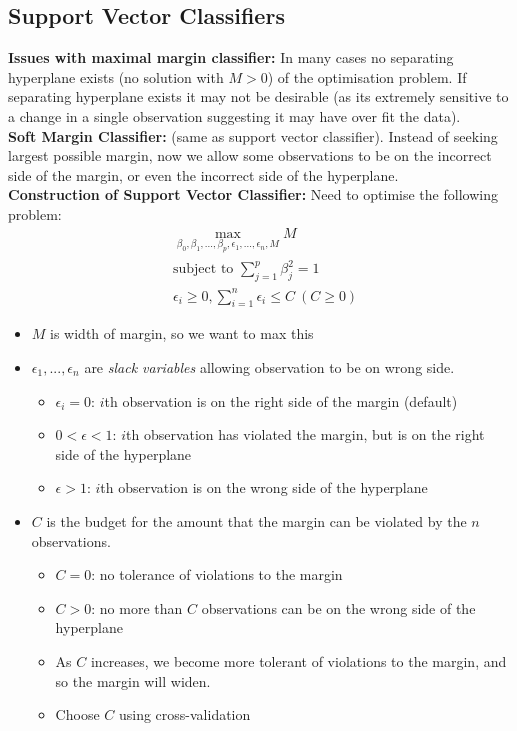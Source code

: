 \documentclass[11pt]{article}
\begin{document}
\subsection{Support Vector Classifiers}

\noindent \textbf{Issues with maximal margin classifier:} In many cases no separating hyperplane exists (no solution with $M>0$) of the optimisation problem. If separating hyperplane exists it may not be desirable (as its extremely sensitive to a change in a single observation suggesting it may have over fit the data). \\

\noindent \textbf{Soft Margin Classifier:} (same as support vector classifier). Instead of seeking largest possible margin, now we allow some observations to be on the incorrect side of the margin, or even the incorrect side of the hyperplane. \\

\noindent \textbf{Construction of Support Vector Classifier:} Need to optimise the following problem:
\begin{align}
    &\max_{\beta_0,\beta_1,...,\beta_p,\epsilon_1,...,\epsilon_n,M}{M} \label{eq:support_vec_class_1} \\
    &\text{subject to } \sum_{j=1}^{p}{\beta_j^2} = 1 \label{eq:support_vec_class_2} \\
    &\epsilon_{i} \geq 0, \sum_{i=1}^{n}\epsilon_i \leq C \: (C \geq 0 \label{eq:support_vec_class_3})
\end{align}
\begin{itemize}
    \item $M$ is width of margin, so we want to max this
    \item $\epsilon_1,...,\epsilon_n$ are \textit{slack variables} allowing observation to be on wrong side.
        \begin{itemize}
            \item $\epsilon_i = 0$: $i$th observation is on the right side of the margin (default)
            \item $0< \epsilon < 1$: $i$th observation has violated the margin, but is on the right side of the hyperplane
            \item $\epsilon>1$: $i$th observation is on the wrong side of the hyperplane
        \end{itemize}
    \item $C$ is the budget for the amount that the margin can be violated by the $n$ observations.
        \begin{itemize}
            \item $C=0$: no tolerance of violations to the margin
            \item $C > 0$: no more than $C$ observations can be on the wrong side of the hyperplane
            \item As $C$ increases, we become more tolerant of violations to the margin, and so the margin will widen.
            \item Choose $C$ using cross-validation
        \end{itemize}
\end{itemize} \phantom{i}
\end{document}

